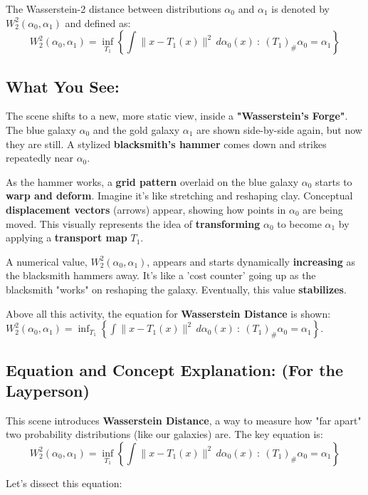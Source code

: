 \documentclass{article}
\begin{document}
\noindent The Wasserstein-2 distance between distributions \( \alpha_0 \) and \( \alpha_1 \) is denoted by \( W_2^2(\alpha_0, \alpha_1) \) and defined as:
\[
W_2^2(\alpha_0, \alpha_1) = \inf_{T_1} \left\{ \int \|x - T_1(x)\|^2 \, d\alpha_0(x) \ : \ (T_1)_\# \alpha_0 = \alpha_1 \right\}
\]

\subsection*{What You See:}

The scene shifts to a new, more static view, inside a \textbf{"Wasserstein's Forge"}.  The blue galaxy \( \alpha_0 \) and the gold galaxy \( \alpha_1 \) are shown side-by-side again, but now they are still.  A stylized \textbf{blacksmith's hammer} comes down and strikes repeatedly near \( \alpha_0 \).

As the hammer works, a \textbf{grid pattern} overlaid on the blue galaxy \( \alpha_0 \) starts to \textbf{warp and deform}.  Imagine it's like stretching and reshaping clay. Conceptual \textbf{displacement vectors} (arrows) appear, showing how points in \( \alpha_0 \) are being moved.  This visually represents the idea of \textbf{transforming} \( \alpha_0 \) to become \( \alpha_1 \) by applying a \textbf{transport map} \( T_1 \).

A numerical value, \textbf{\( W_2^2(\alpha_0, \alpha_1) \)}, appears and starts dynamically \textbf{increasing} as the blacksmith hammers away.  It's like a 'cost counter' going up as the blacksmith "works" on reshaping the galaxy. Eventually, this value \textbf{stabilizes}.

Above all this activity, the equation for \textbf{Wasserstein Distance} is shown: \( W_2^2(\alpha_0, \alpha_1) = \inf_{T_1} \left\{ \int \|x - T_1(x)\|^2 \, d\alpha_0(x) \ : \ (T_1)_\# \alpha_0 = \alpha_1 \right\} \).

\subsection*{Equation and Concept Explanation: (For the Layperson)}

This scene introduces \textbf{Wasserstein Distance}, a way to measure how "far apart" two probability distributions (like our galaxies) are.  The key equation is:
\[
W_2^2(\alpha_0, \alpha_1) = \inf_{T_1} \left\{ \int \|x - T_1(x)\|^2 \, d\alpha_0(x) \ : \ (T_1)_\# \alpha_0 = \alpha_1 \right\}
\]

Let's dissect this equation:
\end{document}
